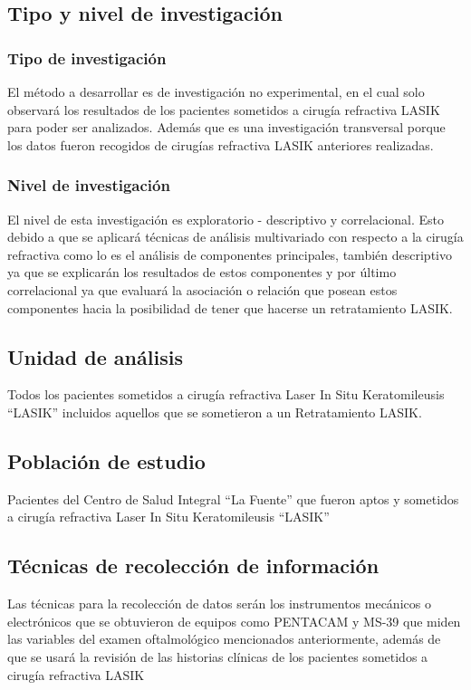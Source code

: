 
\subsection{Tipo y nivel de investigación}

\subsubsection{Tipo de investigación}
El método a desarrollar es de investigación no experimental, en el cual solo observará los resultados de los pacientes sometidos a cirugía refractiva LASIK para poder ser analizados. Además que es una investigación transversal porque los datos fueron recogidos de cirugías refractiva LASIK anteriores realizadas.

\subsubsection{Nivel de investigación}
El nivel de esta investigación es exploratorio - descriptivo y correlacional. Esto debido a que se aplicará técnicas de análisis multivariado con respecto a la cirugía refractiva como lo es el análisis de componentes principales, también descriptivo ya que se explicarán los resultados de estos componentes y por último correlacional ya que evaluará la asociación o relación que posean estos componentes hacia la posibilidad de tener que hacerse un retratamiento LASIK.



\subsection{Unidad de análisis}
Todos los pacientes sometidos a cirugía refractiva Laser In Situ Keratomileusis ``LASIK'' incluidos aquellos que se sometieron a un Retratamiento LASIK.


\subsection{Población de estudio}
Pacientes del Centro de Salud Integral ``La Fuente'' que fueron aptos y sometidos a cirugía refractiva Laser In Situ Keratomileusis ``LASIK''


\subsection{Técnicas de recolección de información}
Las técnicas para la recolección de datos serán los instrumentos mecánicos o electrónicos que se obtuvieron de equipos como PENTACAM y MS-39 que miden las variables del examen oftalmológico mencionados anteriormente, además de que se usará la revisión de las historias clínicas de los pacientes sometidos a cirugía refractiva LASIK


